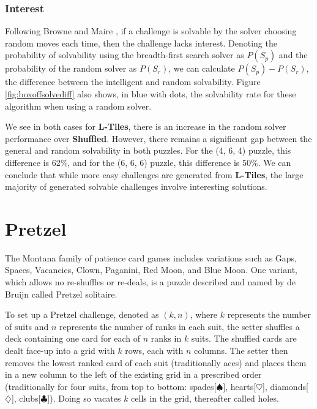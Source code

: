 \documentclass[journal]{IEEEtran}
\begin{document}
\subsubsection{Interest}

Following Browne and Maire \cite{MCPUZZLE}, if a challenge is solvable by the solver choosing random moves each time, then the challenge lacks interest. Denoting the probability of solvability using the breadth-first search solver as $P(S_p)$ and the probability of the random solver as $P(S_r)$, we can calculate $P(S_p) - P(S_r)$, the difference between the intelligent and random solvability. Figure \ref{fig:boxoffsolvediff} also shows, in blue with dots, the solvability rate for these algorithm when using a random solver. 

We see in both cases for {\bf L-Tiles}, there is an increase in the random solver performance over {\bf Shuffled}. However, there remains a significant gap between the general and random solvability in both puzzles. For the (4, 6, 4) puzzle, this difference is 62\%, and for the (6, 6, 6) puzzle, this difference is 50\%. We can conclude that while more easy challenges are generated from {\bf L-Tiles}, the large majority of generated solvable challenges involve interesting solutions.


\section{Pretzel}
\noindent
The Montana family of patience card games includes variations such as Gaps, Spaces, Vacancies, Clown, Paganini, Red Moon, and Blue Moon. One variant, which allows no re-shuffles or re-deals, is a puzzle described and named by de Bruijn \cite{de1981pretzel} called Pretzel solitaire.

To set up a Pretzel challenge, denoted as $(k, n)$, where $k$ represents the number of suits and $n$ represents the number of ranks in each suit, the setter shuffles a deck containing one card for each of $n$ ranks in $k$ suits. The shuffled cards are dealt face-up into a grid with $k$ rows, each with $n$ columns. The setter then removes the lowest ranked card of each suit (traditionally aces) and places them in a new column to the left of the existing grid in a prescribed order (traditionally for four suits, from top to bottom: spades[$\spadesuit$], hearts[$\heartsuit$], diamonds[$\diamondsuit$], clubs[$\clubsuit$]). Doing so vacates $k$ cells in the grid, thereafter called holes. 
\end{document}
